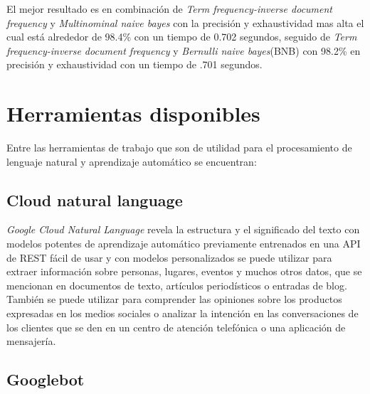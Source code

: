  El mejor resultado es en combinación de \textit{Term frequency-inverse document frequency} y  \textit{Multinominal naive bayes} con la precisión y exhaustividad mas alta el cual está alrededor de 98.4\% con un tiempo de 0.702 segundos, seguido de \textit{Term frequency-inverse document frequency} y \textit{Bernulli naive bayes}(BNB)  con 98.2\% en precisión y exhaustividad con un tiempo de .701 segundos.



\section[Herramientas D]{Herramientas disponibles}


Entre las herramientas de trabajo que son de utilidad para el procesamiento de lenguaje natural y aprendizaje automático se encuentran:\\


\begin{large}
	 \subsection{Cloud natural language}
\end{large} 

\textit{Google Cloud Natural Language} \citep{CD12}   revela la estructura y el significado del texto con modelos potentes de aprendizaje automático previamente entrenados en una API de REST fácil de usar y con modelos personalizados se puede utilizar para extraer información sobre personas, lugares, eventos y muchos otros datos, que se mencionan en documentos de texto, artículos periodísticos o entradas de blog. También se puede utilizar para comprender las opiniones sobre los productos expresadas en los medios sociales o analizar la intención en las conversaciones de los clientes que se den en un centro de atención telefónica o una aplicación de mensajería.\\


\begin{large}
	 \subsection{Googlebot}
\end{large}

